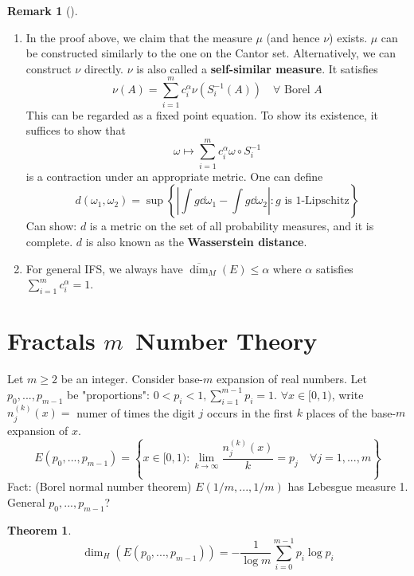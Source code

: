 \documentclass{article}
\theoremstyle{definition}
\newtheorem{thm}{Theorem}
\newtheorem{rem}{Remark}
\newenvironment{rems}[1][]{%
  \begin{rem}[#1]$ $\par\nobreak\ignorespaces
}{%
  \end{rem}
}
\begin{document}
\begin{rems}
	\begin{enumerate}
		\item In the proof above, we claim that the measure $\mu$ (and hence $\nu$) exists.
			$\mu$ can be constructed similarly to the one on the Cantor set.
			Alternatively, we can construct $\nu$ directly.
			$\nu$ is also called a \textbf{self-similar measure}.
			It satisfies
			\[
				\nu(A) = \sum_{i = 1}^m c_i^\alpha \nu(S_i^{-1}(A)) \quad \forall \text{ Borel }A
			\]
			This can be regarded as a fixed point equation.
			To show its existence, it suffices to show that
			\[
				\omega \mapsto \sum_{i = 1}^m c_i^\alpha \omega \circ S_i^{-1}
			\]
			is a contraction under an appropriate metric.
			One can define
			\[
				d(\omega_1, \omega_2) = \sup\left\{ \left| \int g \dd{\omega_1} - \int g \dd{\omega_2} \right|: g \text{ is 1-Lipschitz} \right\}
			\]
			Can show: $d$ is a metric on the set of all probability measures, and it is complete.
			$d$ is also known as the \textbf{Wasserstein distance}.

		\item For general IFS, we always have $\overline{\dim}_M(E) \leq \alpha$ where $\alpha$ satisfies $\sum_{i = 1}^m c_i^\alpha = 1$.
	\end{enumerate}
\end{rems}

\section{Fractals \boldmath$m$\unboldmath \,  Number Theory}

Let $m \geq 2$ be an integer.
Consider base-$m$ expansion of real numbers.
Let $p_0, ..., p_{m - 1}$ be "proportions": $0 < p_i < 1, \sum_{i = 1}^{m - 1} p_i = 1$.
$\forall x \in [0, 1)$, write $n_j^{(k)} (x) =$ numer of times the digit $j$ occurs in the first $k$ places of the base-$m$ expansion of $x$.
\[
	E(p_0, ..., p_{m - 1}) = \left\{ x \in [0, 1): \lim_{k \to \infty} \frac{n_j^{(k)}(x)}{k} = p_j \quad \forall j = 1, ..., m\right\} 
\]
Fact: (Borel normal number theorem) $E(1/m, ..., 1/m)$ has Lebesgue measure 1.
General $p_0, ..., p_{m - 1}$?

\begin{thm}
	\[
		\dim_H(E(p_0, ..., p_{m - 1})) = -\frac{1}{\log m} \sum_{i = 0}^{m - 1} p_i \log p_i
	\]
\end{thm}
\end{document}
